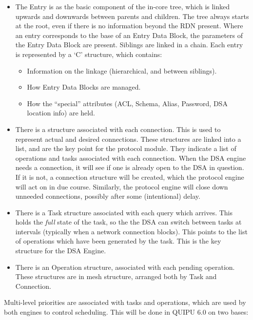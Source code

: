 \begin {itemize}
\item
The Entry is as the basic component of the in-core tree, which is linked
upwards and downwards between parents and children.
The tree always starts at the root, even if there is no information beyond
the RDN present.
Where an entry corresponds to the base of an Entry Data Block, the parameters
of the Entry Data Block are present.
Siblings are linked in a chain.
Each entry is represented by a `C' structure, which contains:

\begin {itemize}
\item
Information on the linkage (hierarchical, and between siblings).

\item
How Entry Data Blocks are managed.

\item
How the ``special'' attributes (ACL, Schema, Alias, Password, DSA location
info) are held.
\end {itemize}

\item
There is a structure associated with each connection.
This is used to represent actual and desired connections.
These structures are linked into a list, and are the key point for the
protocol module.
They indicate a list of operations and tasks associated with each connection.
When the DSA engine needs a connection, it will see if one is already
open to the DSA in question.  If it is not, a connection structure will be
created, which the protocol engine will act on in due course.
Similarly, the protocol engine will close down unneeded connections, possibly
after some (intentional) delay.

\item
There is a Task structure associated with each query which arrives.
This holds the {\em full} state of the task, so the the DSA can switch between
tasks at intervals (typically when a network connection blocks).
This points to the list of operations which have been generated by the task.
This is the key structure for the DSA Engine.

\item
There is an Operation structure, associated with each pending operation.
These structures are in mesh structure, arranged both by Task and Connection.
\end {itemize}

Multi-level priorities are associated with tasks and operations, which are
used by both engines to control scheduling.
This will be done in QUIPU 6.0 on two bases:

